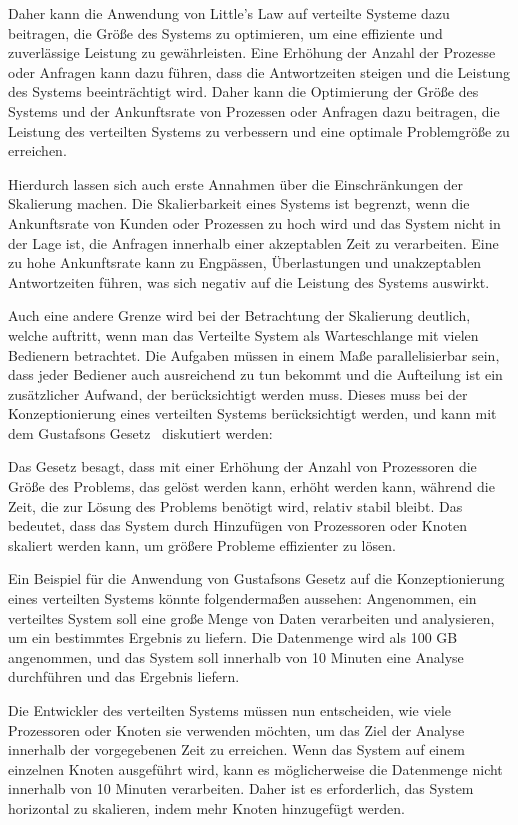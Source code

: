 \documentclass[../vs-script-first-v01.tex]{subfiles}
\begin{document}
\begin{itemize}
Daher kann die Anwendung von Little's Law auf verteilte Systeme dazu beitragen, die Größe des Systems zu optimieren, um eine effiziente und zuverlässige Leistung zu gewährleisten. Eine Erhöhung der Anzahl der Prozesse oder Anfragen kann dazu führen, dass die Antwortzeiten steigen und die Leistung des Systems beeinträchtigt wird. Daher kann die Optimierung der Größe des Systems und der Ankunftsrate von Prozessen oder Anfragen dazu beitragen, die Leistung des verteilten Systems zu verbessern und eine optimale Problemgröße zu erreichen.

Hierdurch lassen sich auch erste Annahmen über die Einschränkungen der Skalierung machen. Die Skalierbarkeit eines Systems ist begrenzt, wenn die Ankunftsrate von Kunden oder Prozessen zu hoch wird und das System nicht in der Lage ist, die Anfragen innerhalb einer akzeptablen Zeit zu verarbeiten. Eine zu hohe Ankunftsrate kann zu Engpässen, Überlastungen und unakzeptablen Antwortzeiten führen, was sich negativ auf die Leistung des Systems auswirkt. 

Auch eine andere Grenze wird bei der Betrachtung der Skalierung deutlich, welche auftritt, wenn man das Verteilte System als Warteschlange mit vielen Bedienern betrachtet. Die Aufgaben müssen in einem Maße parallelisierbar sein, dass jeder Bediener auch ausreichend zu tun bekommt und die Aufteilung ist ein zusätzlicher Aufwand, der berücksichtigt werden muss. Dieses muss bei der Konzeptionierung eines verteilten Systems berücksichtigt werden, und kann mit dem Gustafsons Gesetz~\cite{gustafson1988reevaluating} diskutiert werden: 

Das Gesetz besagt, dass mit einer Erhöhung der Anzahl von Prozessoren die Größe des Problems, das gelöst werden kann, erhöht werden kann, während die Zeit, die zur Lösung des Problems benötigt wird, relativ stabil bleibt. Das bedeutet, dass das System durch Hinzufügen von Prozessoren oder Knoten skaliert werden kann, um größere Probleme effizienter zu lösen.

Ein Beispiel für die Anwendung von Gustafsons Gesetz auf die Konzeptionierung eines verteilten Systems könnte folgendermaßen aussehen: Angenommen, ein verteiltes System soll eine große Menge von Daten verarbeiten und analysieren, um ein bestimmtes Ergebnis zu liefern. Die Datenmenge wird als 100 GB angenommen, und das System soll innerhalb von 10 Minuten eine Analyse durchführen und das Ergebnis liefern.

Die Entwickler des verteilten Systems müssen nun entscheiden, wie viele Prozessoren oder Knoten sie verwenden möchten, um das Ziel der Analyse innerhalb der vorgegebenen Zeit zu erreichen. Wenn das System auf einem einzelnen Knoten ausgeführt wird, kann es möglicherweise die Datenmenge nicht innerhalb von 10 Minuten verarbeiten. Daher ist es erforderlich, das System horizontal zu skalieren, indem mehr Knoten hinzugefügt werden.


\end{itemize}
\end{document}
